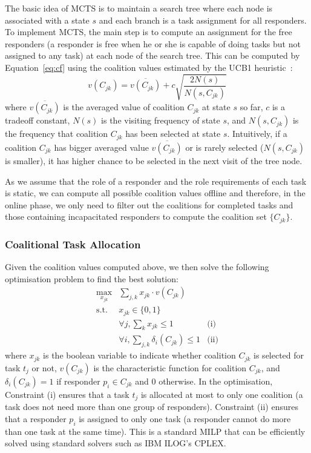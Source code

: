The basic idea of MCTS is to maintain a search tree where each node
is associated with a state $s$ and each branch is a task assignment
for all responders. To implement MCTS, the main step is to compute
an assignment for the free responders (a responder is free when he
or she is capable of doing tasks but not assigned to any task) at
each node of the search tree. This can be computed by
Equation~\ref{eq:cf} using the coalition values estimated by the
UCB1 heuristic~\cite{auer2002finite}:
\begin{equation}
  v(C_{jk}) = \overline{v(C_{jk})} + c\sqrt{\frac{2N(s)}{N(s, C_{jk})}}
\end{equation}
where $\overline{v(C_{jk})}$ is the averaged value of coalition
$C_{jk}$ at state $s$ so far, $c$ is a tradeoff constant, $N(s)$ is
the visiting frequency of state $s$, and $N(s, C_{jk})$ is the
frequency that coalition $C_{jk}$ has been selected at state $s$.
Intuitively, if a coalition $C_{jk}$ has bigger averaged value
$\overline{v(C_{jk})}$ or is rarely selected ($N(s, C_{jk})$ is
smaller), it has higher chance to be selected in the next visit of
the tree node.

As we assume that the role of a responder and the role requirements
of each task is static, we can compute all possible coalition
values offline and therefore, in the online phase, we only need to
filter out the coalitions for completed tasks and those containing
incapacitated responders to compute the coalition set $\{ C_{jk}
\}$.

\subsubsection{Coalitional Task Allocation}
\noindent Given the coalition values computed above, we then solve the following
optimisation problem to find the best solution:
\begin{equation}
  \begin{array}{lll}
    \max\limits_{x_{jk}} & \sum_{j, k} x_{jk} \cdot v(C_{jk}) & \\[2pt]
    \mbox{s.t.} & x_{jk} \in \{0, 1\} & \\[2pt]
    & \forall j, \sum_{k} x_{jk} \leq 1 & \mbox{(i)} \\[2pt]
    & \forall i, \sum_{j, k} \delta_i(C_{jk}) \leq 1 & \mbox{(ii)}
  \end{array}
  \label{eq:cf}
\end{equation}
where $x_{jk}$ is the boolean variable to indicate whether
coalition $C_{jk}$ is selected for task $t_j$ or not, $v(C_{jk})$
is the characteristic function for coalition $C_{jk}$, and
$\delta_i(C_{jk}) = 1$ if responder $p_i\in C_{jk}$ and 0
otherwise. In the optimisation, Constraint (i) ensures that a task
$t_j$ is allocated at most to only one coalition (a task does not
need more than one group of responders). Constraint (ii) ensures
that a responder $p_i$ is assigned to only one task (a responder
cannot do more than one task at the same time). This is a standard
MILP that can be efficiently solved  using standard solvers such as
IBM ILOG's CPLEX.

